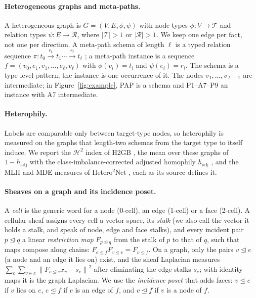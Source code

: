 \documentclass{article}
\newcommand{\norm}[1]{\left\lVert #1\right\rVert}
\newcommand{\inc}{\trianglelefteq}
\begin{document}
\paragraph{Heterogeneous graphs and meta-paths.} A heterogeneous graph is $G=(V,E,\phi,\psi)$ with node types $\phi:V\to\mathcal{T}$ and relation types $\psi:E\to\mathcal{R}$, where $|\mathcal{T}|>1$ or $|\mathcal{R}|>1$. We keep one edge per fact, not one per direction. A meta-path schema of length $\ell$ is a typed relation sequence $\pi: t_0\xrightarrow{r_1}t_1\cdots\xrightarrow{r_\ell}t_\ell$ \cite{sun2011pathsim}; a meta-path instance is a sequence $f=(v_0,e_1,v_1,\ldots,e_\ell,v_\ell)$ with $\phi(v_i)=t_i$ and $\psi(e_i)=r_i$. The schema is a type-level pattern, the instance is one occurrence of it. The nodes $v_1,\dots,v_{\ell-1}$ are intermediate; in Figure~\ref{fig:example}, PAP is a schema and P1--A7--P9 an instance with A7 intermediate.

\paragraph{Heterophily.} Labels are comparable only between target-type nodes, so heterophily is measured on the graphs that length-two schemas from the target type to itself induce. We report the $\mathcal{H}^2$ index of H2GB \cite{lin2025heterophily}, the mean over these graphs of $1-h_{\mathrm{adj}}$ with the class-imbalance-corrected adjusted homophily $h_{\mathrm{adj}}$ \cite{platonov2023characterizing}, and the MLH and MDE measures of Hetero$^2$Net \cite{li2025hetero2net}, each as its source defines it.

\paragraph{Sheaves on a graph and its incidence poset.} A \emph{cell} is the generic word for a node (0-cell), an edge (1-cell) or a face (2-cell). A cellular sheaf assigns every cell a vector space, its \emph{stalk} (we also call the vector it holds a stalk, and speak of node, edge and face stalks), and every incident pair $p\inc q$ a linear \emph{restriction map} $F_{p\inc q}$ from the stalk of $p$ to that of $q$, such that maps compose along chains: $F_{e\inc f}F_{v\inc e}=F_{v\inc f}$. On a graph, only the pairs $v\inc e$ (a node and an edge it lies on) exist, and the sheaf Laplacian measures $\sum_e\sum_{v\in e}\norm{F_{v\inc e}x_v-s_e}^2$ after eliminating the edge stalks $s_e$; with identity maps it is the graph Laplacian. We use the \emph{incidence poset} that adds faces: $v\inc e$ if $v$ lies on $e$, $e\inc f$ if $e$ is an edge of $f$, and $v\inc f$ if $v$ is a node of $f$.
\end{document}
